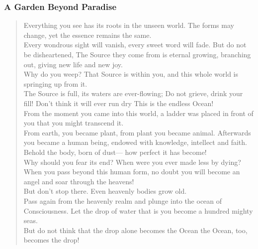 \documentclass[11pt,a4paper]{scrartcl} %
\begin{document}
\subsubsection{A Garden Beyond Paradise}
\begin{verse}
Everything you see has its roots
    in the unseen world.
The forms may change,
    yet the essence remains the same.\\

Every wondrous sight will vanish,
every sweet word will fade.
    But do not be disheartened,
The Source they come from is eternal
growing, branching out,
    giving new life and new joy.\\

Why do you weep?
That Source is within you,
and this whole world
    is springing up from it.\\

The Source is full,
its waters are ever-flowing;
    Do not grieve,
    drink your fill!
Don't think it will ever run dry
This is the endless Ocean!\\

From the moment you came into this world,
a ladder was placed in front of you
    that you might transcend it.\\

From earth, you became plant,
from plant you became animal.
Afterwards you became a human being,
endowed with knowledge, intellect and faith.\\

Behold the body, born of dust—
    how perfect it has become!\\

Why should you fear its end?
When were you ever made less by dying?\\

When you pass beyond this human form,
no doubt you will become an angel
and soar through the heavens!\\

But don't stop there.
Even heavenly bodies grow old.\\

Pass again from the heavenly realm
    and plunge into the ocean of Consciousness.
Let the drop of water that is you
    become a hundred mighty seas.\\

But do not think that the drop alone
becomes the Ocean
    the Ocean, too, becomes the drop!\\
\end{verse}
\textcolor{brown}{\citealp[pg. 246-247]{eknath}}
\end{document}
